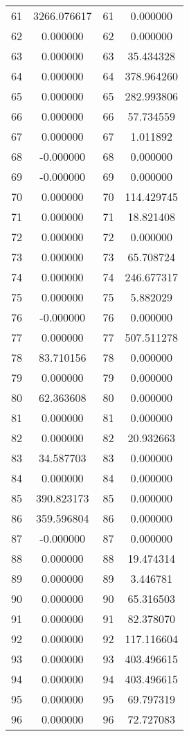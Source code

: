 \documentclass[12pt]{article}
\begin{document}
\begin{longtable}{@{}cccc@{}}
61 & 3266.076617 & 61 & 0.000000 \\
62 & 0.000000 & 62 & 0.000000 \\
63 & 0.000000 & 63 & 35.434328 \\
64 & 0.000000 & 64 & 378.964260 \\
65 & 0.000000 & 65 & 282.993806 \\
66 & 0.000000 & 66 & 57.734559 \\
67 & 0.000000 & 67 & 1.011892 \\
68 & -0.000000 & 68 & 0.000000 \\
69 & -0.000000 & 69 & 0.000000 \\
70 & 0.000000 & 70 & 114.429745 \\
71 & 0.000000 & 71 & 18.821408 \\
72 & 0.000000 & 72 & 0.000000 \\
73 & 0.000000 & 73 & 65.708724 \\
74 & 0.000000 & 74 & 246.677317 \\
75 & 0.000000 & 75 & 5.882029 \\
76 & -0.000000 & 76 & 0.000000 \\
77 & 0.000000 & 77 & 507.511278 \\
78 & 83.710156 & 78 & 0.000000 \\
79 & 0.000000 & 79 & 0.000000 \\
80 & 62.363608 & 80 & 0.000000 \\
81 & 0.000000 & 81 & 0.000000 \\
82 & 0.000000 & 82 & 20.932663 \\
83 & 34.587703 & 83 & 0.000000 \\
84 & 0.000000 & 84 & 0.000000 \\
85 & 390.823173 & 85 & 0.000000 \\
86 & 359.596804 & 86 & 0.000000 \\
87 & -0.000000 & 87 & 0.000000 \\
88 & 0.000000 & 88 & 19.474314 \\
89 & 0.000000 & 89 & 3.446781 \\
90 & 0.000000 & 90 & 65.316503 \\
91 & 0.000000 & 91 & 82.378070 \\
92 & 0.000000 & 92 & 117.116604 \\
93 & 0.000000 & 93 & 403.496615 \\
94 & 0.000000 & 94 & 403.496615 \\
95 & 0.000000 & 95 & 69.797319 \\
96 & 0.000000 & 96 & 72.727083 \\

\end{longtable}
\end{document}
